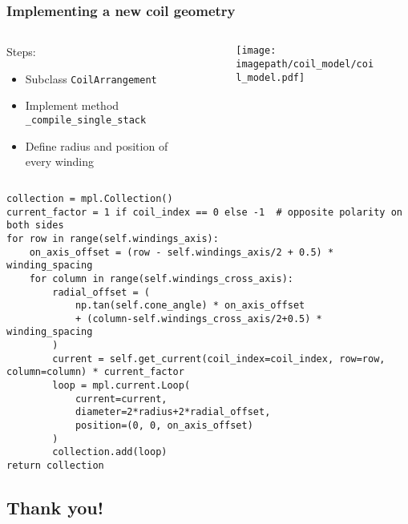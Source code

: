 \begin{frame}[fragile]
    \frametitle{Implementing a new coil geometry}

    \begin{columns}
        \begin{column}{0.5\textwidth}
            {\tiny
                Steps:
                \begin{itemize}
                    \item Subclass \texttt{CoilArrangement}
                    \item Implement method \texttt{\_compile\_single\_stack}
                    \item Define radius and position of every winding
                \end{itemize}
            }
        \end{column}
        \begin{column}{0.48\textwidth}
            \begin{figure}
                \centering
                \texttt{[image: \\imagepath/coil\_model/coil\_model.pdf]}
            \end{figure}
        \end{column}
    \end{columns}
    
    \pause
    \begin{lstlisting}
collection = mpl.Collection()
current_factor = 1 if coil_index == 0 else -1  # opposite polarity on both sides
for row in range(self.windings_axis):
    on_axis_offset = (row - self.windings_axis/2 + 0.5) * winding_spacing
    for column in range(self.windings_cross_axis):
        radial_offset = (
            np.tan(self.cone_angle) * on_axis_offset
            + (column-self.windings_cross_axis/2+0.5) * winding_spacing
        )
        current = self.get_current(coil_index=coil_index, row=row, column=column) * current_factor
        loop = mpl.current.Loop(
            current=current,
            diameter=2*radius+2*radial_offset,
            position=(0, 0, on_axis_offset)
        )
        collection.add(loop)
return collection
    \end{lstlisting}
\end{frame}


\begin{frame}
    \section*{Thank you!}
\end{frame}

